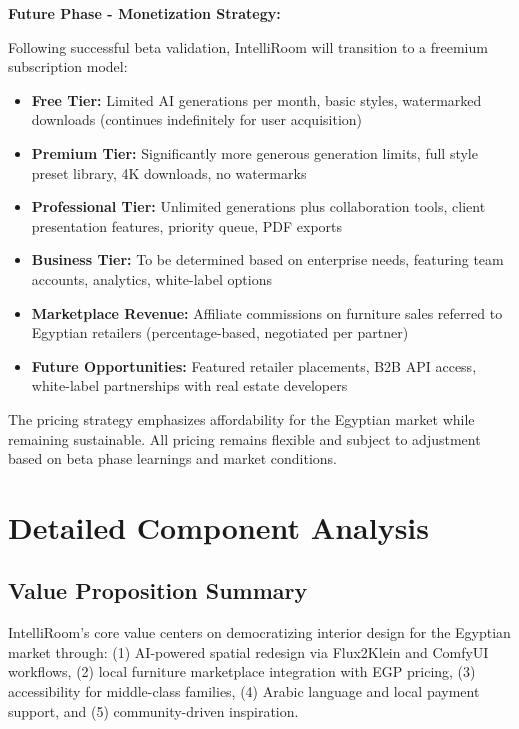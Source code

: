 \textbf{Future Phase - Monetization Strategy:}

Following successful beta validation, IntelliRoom will transition to a freemium subscription model:
\begin{itemize}
    \item \textbf{Free Tier:} Limited AI generations per month, basic styles, watermarked downloads (continues indefinitely for user acquisition)
    \item \textbf{Premium Tier:} Significantly more generous generation limits, full style preset library, 4K downloads, no watermarks
    \item \textbf{Professional Tier:} Unlimited generations plus collaboration tools, client presentation features, priority queue, PDF exports
    \item \textbf{Business Tier:} To be determined based on enterprise needs, featuring team accounts, analytics, white-label options
    \item \textbf{Marketplace Revenue:} Affiliate commissions on furniture sales referred to Egyptian retailers (percentage-based, negotiated per partner)
    \item \textbf{Future Opportunities:} Featured retailer placements, B2B API access, white-label partnerships with real estate developers
\end{itemize}

The pricing strategy emphasizes affordability for the Egyptian market while remaining sustainable. All pricing remains flexible and subject to adjustment based on beta phase learnings and market conditions.

\section{Detailed Component Analysis}
\label{sec:app_bmc_detail}

\subsection{Value Proposition Summary}

IntelliRoom's core value centers on democratizing interior design for the Egyptian market through: (1) AI-powered spatial redesign via Flux2Klein and ComfyUI workflows, (2) local furniture marketplace integration with EGP pricing, (3) accessibility for middle-class families, (4) Arabic language and local payment support, and (5) community-driven inspiration.

